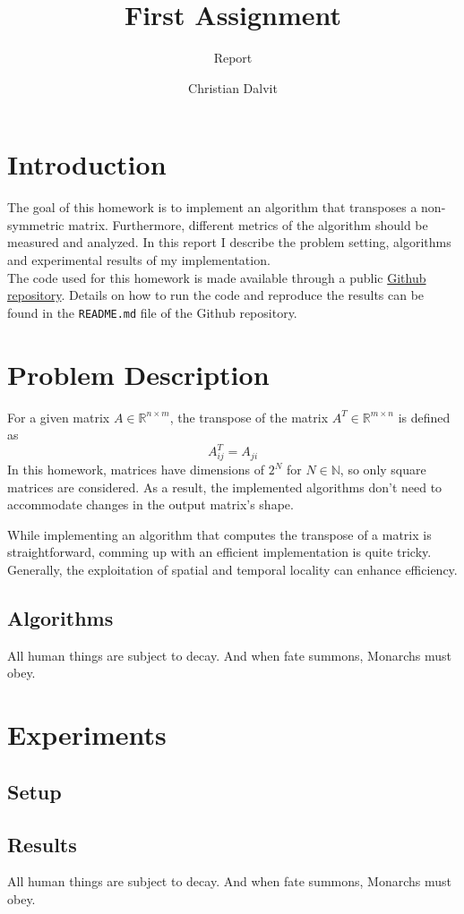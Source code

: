 \documentclass{scrartcl}
\title{First Assignment}
\subtitle{Report}
\author{Christian Dalvit}
\begin{document}
    \maketitle
    \section{Introduction}    
    The goal of this homework is to implement an algorithm that transposes a non-symmetric matrix. Furthermore, different metrics of the algorithm should be measured and analyzed. In this report I describe the problem setting, algorithms and experimental results of my implementation.\\
    The code used for this homework is made available through a public \href{https://github.com/chrisdalvit/matrix-transpose-benchmark}{Github repository}. Details on how to run the code and reproduce the results can be found in the \texttt{README.md} file of the Github repository.

    \section{Problem Description}
    For a given matrix $A \in \mathbb{R}^{n \times m}$, the transpose of the matrix $A^T \in \mathbb{R}^{m \times n}$ is defined as
    $$
        A^T_{ij} = A_{ji}
    $$
    In this homework, matrices have dimensions of $2^N$ for $N \in \mathbb{N}$, so only square matrices are considered. As a result, the implemented algorithms don't need to accommodate changes in the output matrix's shape.

    While implementing an algorithm that computes the transpose of a matrix is straightforward, comming up with an efficient implementation is quite tricky. Generally, the exploitation of spatial and temporal locality can enhance efficiency.

    \subsection{Algorithms}
    All human things are subject to decay. And when fate summons, Monarchs must obey.

    \section{Experiments}
    \subsection{Setup}
    \subsection{Results}
    All human things are subject to decay. And when fate summons, Monarchs must obey.
\end{document}
